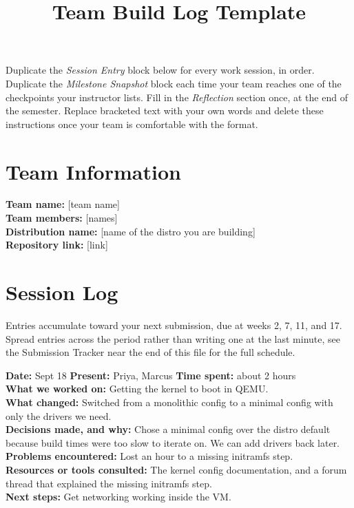 \documentclass[11pt]{article}
\title{Team Build Log Template}
\author{}
\date{}
\begin{document}
\thispagestyle{fancy}


\begin{noteBox}
Duplicate the \emph{Session Entry} block below for every work session, in order. Duplicate the \emph{Milestone Snapshot} block each time your team reaches one of the checkpoints your instructor lists. Fill in the \emph{Reflection} section once, at the end of the semester. Replace bracketed text with your own words and delete these instructions once your team is comfortable with the format.
\end{noteBox}

\section{Team Information}

\begin{fillBox}
\textbf{Team name:} [team name] \\
\textbf{Team members:} [names] \\
\textbf{Distribution name:} [name of the distro you are building] \\
\textbf{Repository link:} [link]
\end{fillBox}

\section{Session Log}

Entries accumulate toward your next submission, due at weeks 2, 7, 11, and 17. Spread entries across the period rather than writing one at the last minute, see the Submission Tracker near the end of this file for the full schedule.

\begin{tipBox}
\textbf{Date:} Sept 18 \quad \textbf{Present:} Priya, Marcus \quad \textbf{Time spent:} about 2 hours \\
\textbf{What we worked on:} Getting the kernel to boot in QEMU. \\
\textbf{What changed:} Switched from a monolithic config to a minimal config with only the drivers we need. \\
\textbf{Decisions made, and why:} Chose a minimal config over the distro default because build times were too slow to iterate on. We can add drivers back later. \\
\textbf{Problems encountered:} Lost an hour to a missing initramfs step. \\
\textbf{Resources or tools consulted:} The kernel config documentation, and a forum thread that explained the missing initramfs step. \\
\textbf{Next steps:} Get networking working inside the VM.
\end{tipBox}
\end{document}
